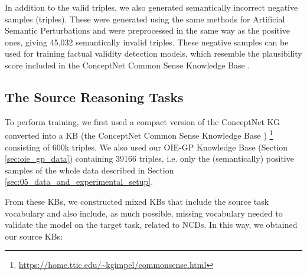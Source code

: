 \documentclass[preprint]{elsarticle}
\begin{document}


In addition to the valid triples, we also generated semantically incorrect negative samples (triples). These were generated using the same methods for Artificial Semantic Perturbations and were preprocessed in the same way as the positive ones, giving 45,032 semantically invalid triples. These negative samples can be used for training factual validity detection models, which resemble the plausibility score included in the ConceptNet Common Sense Knowledge Base \cite{li2016commonsense}.

\subsection{The Source Reasoning Tasks}\label{sec:source_tasks}
To perform training, we first used a compact version of the ConceptNet KG converted into a KB (the ConceptNet Common Sense Knowledge Base \cite{li2016commonsense}) \footnote{\url{https://home.ttic.edu/~kgimpel/commonsense.html}} consisting of 600k triples. We also used our OIE-GP Knowledge Base (Section \ref{sec:oie_gp_data}) containing 39166 triples, i.e. only the (semantically) positive samples of the whole data described in Section \ref{sec:05_data_and_experimental_setup}. 

From these KBs, we constructed mixed KBs that include the source task vocabulary and also include, as much possible, missing vocabulary needed to validate the model on the target task, related to NCDs. In this way, we obtained our source KBs:
\end{document}
